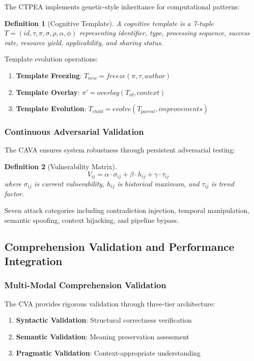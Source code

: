 \documentclass[12pt,a4paper]{article}
\newtheorem{definition}{Definition}
\begin{document}
The CTPEA implements genetic-style inheritance for computational patterns:

\begin{definition}[Cognitive Template]
A cognitive template is a 7-tuple $T = (id, \tau, \pi, \sigma, \rho, \alpha, \phi)$ representing identifier, type, processing sequence, success rate, resource yield, applicability, and sharing status.
\end{definition}

Template evolution operations:
\begin{enumerate}
\item \textbf{Template Freezing}: $T_{new} = freeze(\pi, \tau, author)$
\item \textbf{Template Overlay}: $\pi' = overlay(T_{id}, context)$
\item \textbf{Template Evolution}: $T_{child} = evolve(T_{parent}, improvements)$
\end{enumerate}

\subsubsection{Continuous Adversarial Validation}

The CAVA ensures system robustness through persistent adversarial testing:

\begin{definition}[Vulnerability Matrix]
\begin{equation}
V_{ij} = \alpha \cdot \sigma_{ij} + \beta \cdot h_{ij} + \gamma \cdot \tau_{ij}
\end{equation}
where $\sigma_{ij}$ is current vulnerability, $h_{ij}$ is historical maximum, and $\tau_{ij}$ is trend factor.
\end{definition}

Seven attack categories including contradiction injection, temporal manipulation, semantic spoofing, context hijacking, and pipeline bypass.

\subsection{Comprehension Validation and Performance Integration}

\subsubsection{Multi-Modal Comprehension Validation}

The CVA provides rigorous validation through three-tier architecture:
\begin{enumerate}
\item \textbf{Syntactic Validation}: Structural correctness verification
\item \textbf{Semantic Validation}: Meaning preservation assessment
\item \textbf{Pragmatic Validation}: Context-appropriate understanding
\end{enumerate}
\end{document}
